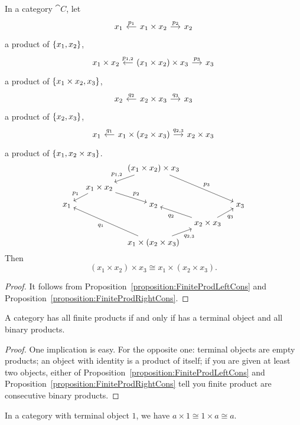 \begin{corollary}\label{corollary:ProdAssoc}
  In a category \(\cat C\), let
  \[\begin{tikzcd}[sep=small]
      x_1 & x_1 \times x_2 \ar["{p_1}", l, swap] \ar["{p_2}", r] & x_2
    \end{tikzcd}\] a product of \(\left\{x_1, x_2\right\}\),
  \[\begin{tikzcd}[sep=small]
      x_1 \times x_2 & (x_1 \times x_2) \times x_3 \ar["{p_{1,2}}", l, swap]
      \ar["{p_3}", r] & x_3
    \end{tikzcd}\] a product of \(\left\{x_1 \times x_2, x_3\right\}\),
  \[\begin{tikzcd}[sep=small]
      x_2 & x_2 \times x_3 \ar["{q_2}", l, swap] \ar["{q_3}", r] & x_3
    \end{tikzcd}\] a product of \(\left\{x_2, x_3\right\}\),
  \[\begin{tikzcd}[sep=small]
      x_1 & x_1 \times (x_2 \times x_3) \ar["{q_1}", l, swap] \ar["{q_{2,3}}",
      r] & x_2 \times x_3
    \end{tikzcd}\] a product of \(\left\{x_1, x_2 \times x_3\right\}\).
  \[\begin{tikzcd}[sep=small,cramped]
      & & (x_1 \times x_2) \times x_3 \ar["{p_{1,2}}", dl, swap] \ar["{p_3}", ddrr] \\
      & x_1 \times x_2 \ar["{p_1}", dl, swap] \ar["{p_2}", dr] \\
      x_1 & & x_2 & & x_3 \\
      & & & x_2 \times x_3 \ar["{q_2}", ul] \ar["{q_3}", ur, swap] \\
      & & x_1 \times (x_2 \times x_3) \ar["{q_1}", uull] \ar["{q_{2, 3}}", ur,
      swap]
    \end{tikzcd}\] Then
  \[(x_1 \times x_2) \times x_3 \cong x_1 \times (x_2 \times x_3) .\]
\end{corollary}

\begin{proof}
  It follows from Proposition~\ref{proposition:FiniteProdLeftCons} and
  Proposition~\ref{proposition:FiniteProdRightCons}.
\end{proof}

\begin{corollary}\label{corollary:FiniteProductsIffTerminalAndBinaryProducts}
  A category has all finite products if and only if has a terminal
  object and all binary products.
\end{corollary}

\begin{proof}
  One implication is easy. For the opposite one: terminal objects are
  empty products; an object with identity is a product of itself; if
  you are given at least two objects, either of
  Proposition~\ref{proposition:FiniteProdLeftCons} and
  Proposition~\ref{proposition:FiniteProdRightCons} tell you finite
  product are consecutive binary products.
\end{proof}

\begin{exercise}
  In a category with terminal object \(1\), we have
  \(a \times 1 \cong 1 \times a \cong a\).
\end{exercise}

